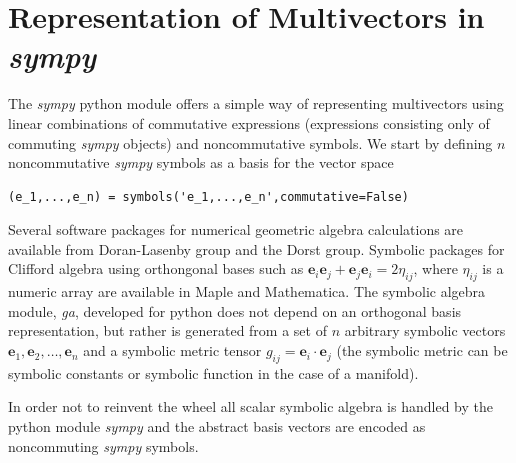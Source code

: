\documentclass[12pt,twoside,openright]{memoir}
\newcommand{\bm}[1]{\boldsymbol{#1}}
\newcommand{\eb}{\bm{e}}
\begin{document}
\section{Representation of Multivectors in \emph{sympy}}

The \emph{sympy} python module offers a simple way of representing multivectors using linear
combinations of commutative expressions (expressions consisting only of commuting \emph{sympy} objects)
and noncommutative symbols. We start by defining $n$ noncommutative \emph{sympy} symbols as a basis for 
the vector space
\begin{lstlisting}[numbers=none]
   (e_1,...,e_n) = symbols('e_1,...,e_n',commutative=False)
\end{lstlisting}
Several software packages for numerical geometric algebra calculations are
available from Doran-Lasenby group and the Dorst group. Symbolic packages for
Clifford algebra using orthongonal bases such as
$\eb_{i}\eb_{j}+\eb_{j}\eb_{i} = 2\eta_{ij}$, where $\eta_{ij}$ is a numeric
array are available in Maple and Mathematica. The symbolic algebra module,
{\em ga}, developed for python does not depend on an orthogonal basis
representation, but rather is generated from a set of $n$ arbitrary
symbolic vectors $\eb_{1},\eb_{2},\dots,\eb_{n}$ and a symbolic metric
tensor $g_{ij} = \eb_{i}\cdot \eb_{j}$ (the symbolic metric can be symbolic constants
or symbolic function in the case of a manifold).

In order not to reinvent the wheel all scalar symbolic algebra is handled by the
python module \emph{sympy} and the abstract basis vectors are encoded as
noncommuting \emph{sympy} symbols.
\end{document}

